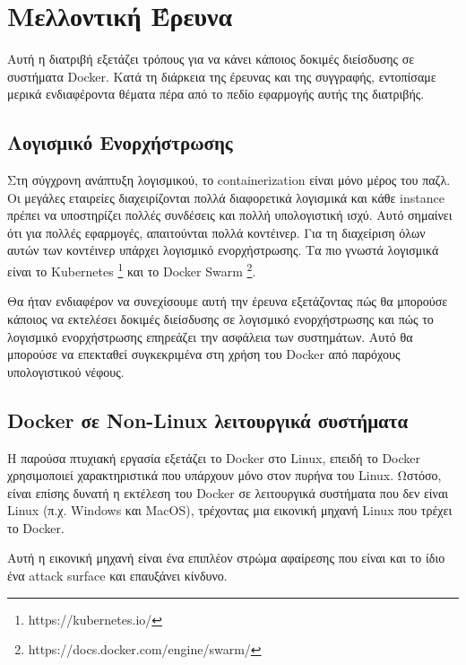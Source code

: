 \chapter{Μελλοντική Έρευνα}
\label{futureWork}

Αυτή η διατριβή εξετάζει τρόπους για να κάνει κάποιος δοκιμές διείσδυσης σε
συστήματα \textlatin{Docker}. Κατά τη διάρκεια της έρευνας και της συγγραφής,
εντοπίσαμε μερικά ενδιαφέροντα θέματα πέρα από το πεδίο εφαρμογής αυτής της
διατριβής.

\section{Λογισμικό Ενορχήστρωσης}

Στη σύγχρονη ανάπτυξη λογισμικού, το \textlatin{containerization} είναι μόνο
μέρος του παζλ. Οι μεγάλες εταιρείες διαχειρίζονται πολλά διαφορετικά λογισμικά
και κάθε \textlatin{instance} πρέπει να υποστηρίζει πολλές συνδέσεις και πολλή
υπολογιστική ισχύ. Αυτό σημαίνει ότι για πολλές εφαρμογές, απαιτούνται πολλά
κοντέινερ. Για τη διαχείριση όλων αυτών των κοντέινερ υπάρχει λογισμικό
ενορχήστρωσης. Τα πιο γνωστά λογισμικά είναι το \textlatin{Kubernetes} 
\footnote{\textlatin{https://kubernetes.io/}} και το \textlatin{Docker
Swarm} \footnote{\textlatin{https://docs.docker.com/engine/swarm/}}.

Θα ήταν ενδιαφέρον να συνεχίσουμε αυτή την έρευνα εξετάζοντας πώς
θα μπορούσε κάποιος να εκτελέσει δοκιμές διείσδυσης σε λογισμικό ενορχήστρωσης
και πώς το λογισμικό ενορχήστρωσης επηρεάζει την ασφάλεια των συστημάτων. Αυτό
θα μπορούσε να επεκταθεί συγκεκριμένα στη χρήση του \textlatin{Docker} από
παρόχους υπολογιστικού νέφους.

\section{\textlatin{Docker} σε \textlatin{Non-Linux} λειτουργικά συστήματα}

Η παρούσα πτυχιακή εργασία εξετάζει το \textlatin{Docker} στο \textlatin{Linux},
επειδή το \textlatin{Docker} χρησιμοποιεί χαρακτηριστικά που υπάρχουν μόνο στον
πυρήνα του \textlatin{Linux}. Ωστόσο, είναι επίσης δυνατή η εκτέλεση του
\textlatin{Docker} σε λειτουργικά συστήματα που δεν είναι \textlatin{Linux}
(π.χ. \textlatin{Windows} και \textlatin{MacOS}), τρέχοντας μια εικονική μηχανή
\textlatin{Linux} που τρέχει το \textlatin{Docker}.

Αυτή η εικονική μηχανή είναι ένα επιπλέον στρώμα αφαίρεσης που είναι και το
ίδιο ένα \textlatin{attack surface} και επαυξάνει κίνδυνο.

